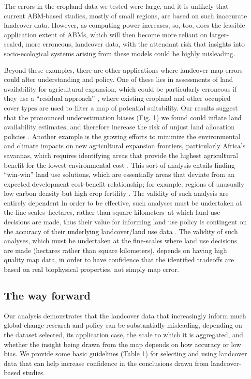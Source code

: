 \documentclass[a4paper]{article}
\begin{document}
The errors in the cropland data we tested were large, and it is unlikely that current ABM-based studies, mostly of small regions, are based on such inaccurate landcover data. However, as computing power increases, so, too, does the feasible application extent of ABMs, which will then become more reliant on larger-scaled, more erroneous, landcover data, with the attendant risk that insights into socio-ecological systems arising from these models could be highly misleading.  

Beyond these examples, there are other applications where landcover map errors could alter understanding and policy. One of these lies in assessments of land availability for agricultural expansion, which could be particularly erroneous if they use a ``residual approach'' \citep{lambin_estimating_2013}, where existing cropland and other occupied cover types are used to filter a map of potential suitability. Our results suggest that the pronounced underestimation biases (Fig. 1) we found could inflate land availability estimates, and therefore increase the risk of unjust land allocation policies \citep{rulli_global_2013}. Another example is the growing efforts to minimize the environmental and climate impacts on new agricultural expansion frontiers, particularly Africa's savannas, which requires identifying areas that provide the highest agricultural benefit for the lowest environmental cost \citep{searchinger_high_2015}. This sort of analysis entails finding ``win-win'' land use solutions, which are essentially areas that deviate from an expected development cost-benefit relationship; for example, regions of unusually low carbon density but high crop fertility \citep{searchinger_high_2015}. The validity of such analysis are entirely dependent In order to be effective, such analyses must be undertaken at the fine scales--hectares, rather than square kilometers--at which land use decisions are made, thus their value for informing land use policy is contingent on the accuracy of their underlying landcover/land use data \citep{searchinger_high_2015}. The validity of such analyses, which must be undertaken at the fine-scales where land use decisions are made (hectares rather than square kilometers), depends on having high quality map data, in order to have confidence that the identified tradeoffs are based on real biophysical properties, not simply map error.

\subsection*{The way forward}
Our analysis demonstrates that the landcover data that increasingly inform much global change research and policy can be substantially misleading, depending on the dataset selected, its application case, the scale to which it is aggregated, and whether the insight being drawn from the map depends on how accuracy or low bias. We provide some basic guidelines (Table 1) for selecting and using landcover data that can help increase confidence in the conclusions drawn from landcover-based studies. 
\end{document}
